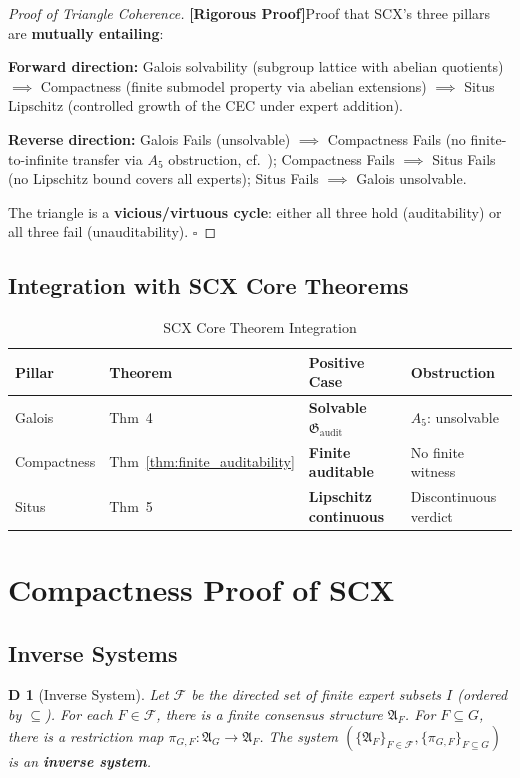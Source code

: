 \documentclass[12pt,a4paper]{article}
\newtheorem{definition}[theorem]Definition
\theoremstyle{remark}
\newcommand{\AuditGrp}{\mathfrak{G}_{\mathrm{audit}}}
\newcommand{\Struct}{\mathfrak{A}}
\newcommand{\rigorous}{\textnormal{\textbf{[Rigorous Proof]}}}
\begin{document}
\begin{proof}[Proof of Triangle Coherence]
\rigorous Proof that SCX's three pillars are \textbf{mutually entailing}:

\textbf{Forward direction:} Galois solvability (subgroup lattice with abelian quotients) \(\implies\) Compactness (finite submodel property via abelian extensions) \(\implies\) Situs Lipschitz (controlled growth of the CEC under expert addition).

\textbf{Reverse direction:} Galois Fails (unsolvable) \(\implies\) Compactness Fails (no finite-to-infinite transfer via \(A_5\) obstruction, cf.~\cite{scx_galois}); Compactness Fails \(\implies\) Situs Fails (no Lipschitz bound covers all experts); Situs Fails \(\implies\) Galois unsolvable.

The triangle is a \textbf{vicious/virtuous cycle}: either all three hold (auditability) or all three fail (unauditability). \(\square\)
\end{proof}

\subsection{Integration with SCX Core Theorems}
\begin{table}[H]
\centering
\caption{SCX Core Theorem Integration}
\label{tab:triangle_theorems}
\begin{tabular}{@{}p{2.5cm} p{3.5cm} p{3.5cm} p{3.5cm}@{}}
\toprule
\textbf{Pillar} & \textbf{Theorem} & \textbf{Positive Case} & \textbf{Obstruction} \\
\midrule
Galois & Thm~4~\cite{scx_galois} & \textbf{Solvable \(\AuditGrp\)} & \(A_5\): unsolvable \\
Compactness & Thm~\ref{thm:finite_auditability} & \textbf{Finite auditable} & No finite witness \\
Situs & Thm~5~\cite{scx2026theorems} & \textbf{Lipschitz continuous} & Discontinuous verdict \\
\bottomrule
\end{tabular}
\end{table}
\section{Compactness Proof of SCX}
\subsection{Inverse Systems}
\begin{definition}[Inverse System]
Let \(\mathcal{F}\) be the directed set of finite expert subsets \(I\) (ordered by \(\subseteq\)). For each \(F \in \mathcal{F}\), there is a finite consensus structure \(\Struct_F\). For \(F \subseteq G\), there is a restriction map \(\pi_{G,F}: \Struct_G \to \Struct_F\). The system \((\{\Struct_F\}_{F \in \mathcal{F}}, \{\pi_{G,F}\}_{F \subseteq G})\) is an \textbf{inverse system}.
\end{definition}
\end{document}

